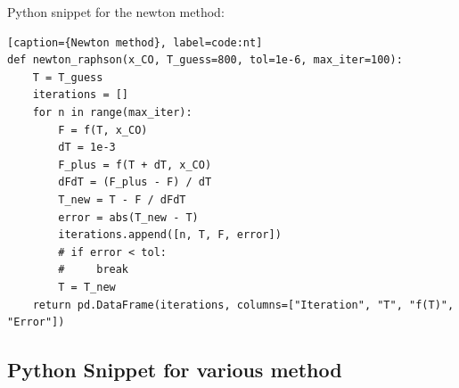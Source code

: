 \documentclass[10pt]{article}
\begin{document}
Python snippet for the newton method:
\begin{lstlisting}[style=custompython][caption={Newton method}, label=code:nt]
def newton_raphson(x_CO, T_guess=800, tol=1e-6, max_iter=100):
    T = T_guess
    iterations = []
    for n in range(max_iter):
        F = f(T, x_CO)
        dT = 1e-3
        F_plus = f(T + dT, x_CO)
        dFdT = (F_plus - F) / dT
        T_new = T - F / dFdT
        error = abs(T_new - T)
        iterations.append([n, T, F, error])
        # if error < tol:
        #     break
        T = T_new
    return pd.DataFrame(iterations, columns=["Iteration", "T", "f(T)", "Error"])
\end{lstlisting}


\subsection{Python Snippet for various method}
\end{document}
